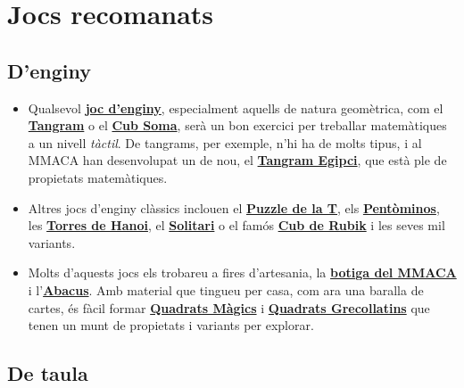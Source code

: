 \documentclass[a4paper, 12pt]{article}
\begin{document}
    \newpage %

    \section*{Jocs recomanats}

        \subsection*{D'enginy}

            \begin{itemize}
                \item Qualsevol \href{http://robspuzzlepage.com/mainmenu.htm}{\textbf{joc d'enginy}}, especialment aquells de natura geomètrica, com el \href{https://ca.wikipedia.org/wiki/Tangram}{\textbf{Tangram}} o el \href{https://ca.wikipedia.org/wiki/Cub_Soma}{\textbf{Cub Soma}}, serà un bon exercici per treballar matemàtiques a un nivell \emph{tàctil}. De tangrams, per exemple, n'hi ha de molts tipus, i al MMACA han desenvolupat un de nou, el \href{https://github.com/CarlosLunaMota/The-Egyptian-Tangram}{\textbf{Tangram Egipci}}, que està ple de propietats matemàtiques.
                \item Altres jocs d'enginy clàssics inclouen el \href{https://en.wikipedia.org/wiki/T_puzzle}{\textbf{Puzzle de la T}}, els \href{https://ca.wikipedia.org/wiki/Pent\%C3\%B2mino}{\textbf{Pentòminos}}, les \href{https://ca.wikipedia.org/wiki/Torres_de_Hanoi}{\textbf{Torres de Hanoi}}, el \href{https://ca.wikipedia.org/wiki/Solitari_(joc_de_tauler)}{\textbf{Solitari}} o el famós \href{https://ca.wikipedia.org/wiki/Cub_de_Rubik}{\textbf{Cub de Rubik}} i les seves mil variants.
                \item Molts d'aquests jocs els trobareu a fires d'artesania, la \href{https://mmaca.cat/botiga/}{\textbf{botiga del MMACA}} i l'\href{https://www.abacus.coop/ca/home}{\textbf{Abacus}}. Amb material que tingueu per casa, com ara una baralla de cartes, és fàcil formar \href{https://ca.wikipedia.org/wiki/Quadrat_m\%C3\%A0gic}{\textbf{Quadrats Màgics}} i \href{https://ca.wikipedia.org/wiki/Quadrat_grecollat\%C3\%AD}{\textbf{Quadrats Grecollatins}} que tenen un munt de propietats i variants per explorar.
            \end{itemize}

        \subsection*{De taula}
\end{document}
